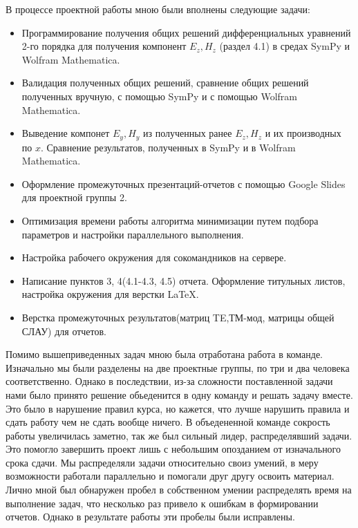 \documentclass{article}
\begin{document}
В процессе проектной работы мною были вполнены следующие задачи: 
\begin{itemize}
    \item Программирование получения общих решений дифференциальных уравнений 2-го порядка для получения компонент $E_z, H_z$ (раздел 4.1) в средах SymPy и Wolfram Mathematica.
    \item Валидация полученных общих решений, сравнение общих решений полученных вручную, с помощью SymPy и с помощью Wolfram Mathematica.
    \item Выведение компонет $E_y, H_y$ из полученных ранее $E_z, H_z$ и их производных по $x$. Сравнение результатов, полученных в SymPy и в Wolfram Mathematica.
    \item Оформление промежуточных презентаций-отчетов с помощью Google Slides для проектной группы 2.
    \item Оптимизация времени работы алгоритма минимизации путем подбора параметров и настройки параллельного выполнения.
    \item Настройка рабочего окружения для сокомандников на сервере.
    \item Написание пунктов 3, 4(4.1-4.3, 4.5) отчета. Оформление титульных листов, настройка окружения для верстки \LaTeX.
    \item Верстка промежуточных результатов(матриц TE,ТМ-мод, матрицы общей СЛАУ) для отчетов.
\end{itemize}

Помимо вышеприведенных задач мною была отработана работа в команде. Изначально мы были разделены на две проектные группы, по три и два человека соответственно. Однако в последствии, из-за сложности поставленной задачи нами было принято решение обьеденится в одну команду и решать задачу вместе. Это было в нарушение правил курса, но кажется, что лучше нарушить правила и сдать работу чем не сдать вообще ничего. В объедененной команде сокрость работы увеличилась заметно, так же был сильный лидер, распределявший задачи. Это помогло завершить проект лишь с небольшим опозданием от изначального срока сдачи. Мы распределяли задачи относительно своиз умений, в меру возможности работали параллельно и помогали друг другу освоить материал. Лично мной был обнаружен пробел в собственном умении распределять время на выполнение задач, что несколько раз привело к ошибкам в формировании отчетов. Однако в результате работы эти пробелы были исправлены. \\[10pt]\par
\end{document}
